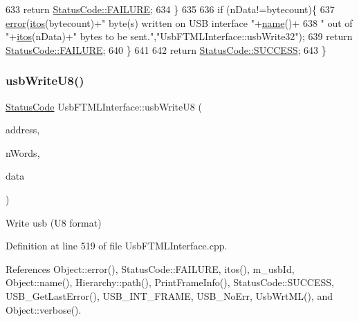 \begin{DoxyCode}
633     \textcolor{keywordflow}{return} \hyperlink{classStatusCode_a6f565cbeadc76d14c72f047e5e85eb4ba3da73d4c469762eb9d3c960368252b26}{StatusCode::FAILURE};
634   \}
635 
636   \textcolor{keywordflow}{if} (nData!=bytecount)\{
637     \hyperlink{classObject_a204a95f57818c0f811933917a30eff45}{error}(\hyperlink{Tools_8h_af330027dbdafb9a30768b3613c553e60}{itos}(bytecount)+\textcolor{stringliteral}{" byte(s) written on USB interface "}+\hyperlink{classObject_a300f4c05dd468c7bb8b3c968868443c1}{name}()+
638             \textcolor{stringliteral}{" out of "}+\hyperlink{Tools_8h_af330027dbdafb9a30768b3613c553e60}{itos}(nData)+\textcolor{stringliteral}{" bytes to be sent."},\textcolor{stringliteral}{"UsbFTMLInterface::usbWrite32"});
639     \textcolor{keywordflow}{return} \hyperlink{classStatusCode_a6f565cbeadc76d14c72f047e5e85eb4ba3da73d4c469762eb9d3c960368252b26}{StatusCode::FAILURE};    
640   \}
641 
642   \textcolor{keywordflow}{return} \hyperlink{classStatusCode_a6f565cbeadc76d14c72f047e5e85eb4badd0da38d3ba0d922efd1f4619bc37ad8}{StatusCode::SUCCESS};  
643 \}
\end{DoxyCode}
\mbox{\label{classUsbFTMLInterface_ae5cb7b250be9be23f90f455f57d41287}} 
\subsubsection{\texorpdfstring{usb\+Write\+U8()}{usbWriteU8()}}
{\footnotesize\ttfamily \hyperlink{classStatusCode}{Status\+Code} Usb\+F\+T\+M\+L\+Interface\+::usb\+Write\+U8 (\begin{DoxyParamCaption}\item[{unsigned long int}]{address,  }\item[{unsigned long int}]{n\+Words,  }\item[{unsigned char $\ast$}]{data }\end{DoxyParamCaption})}

Write usb (U8 format) 

Definition at line 519 of file Usb\+F\+T\+M\+L\+Interface.\+cpp.



References Object\+::error(), Status\+Code\+::\+F\+A\+I\+L\+U\+RE, itos(), m\+\_\+usb\+Id, Object\+::name(), Hierarchy\+::path(), Print\+Frame\+Info(), Status\+Code\+::\+S\+U\+C\+C\+E\+SS, U\+S\+B\+\_\+\+Get\+Last\+Error(), U\+S\+B\+\_\+\+I\+N\+T\+\_\+\+F\+R\+A\+ME, U\+S\+B\+\_\+\+No\+Err, Usb\+Wrt\+M\+L(), and Object\+::verbose().



